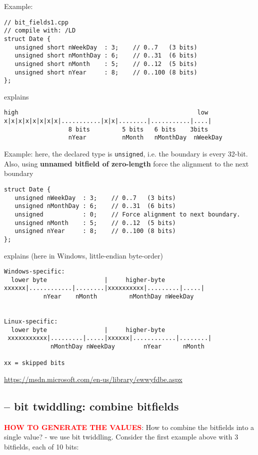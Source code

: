 Example:
\begin{lstlisting}
// bit_fields1.cpp
// compile with: /LD
struct Date {
   unsigned short nWeekDay  : 3;    // 0..7   (3 bits)
   unsigned short nMonthDay : 6;    // 0..31  (6 bits)
   unsigned short nMonth    : 5;    // 0..12  (5 bits)
   unsigned short nYear     : 8;    // 0..100 (8 bits)
};
\end{lstlisting}
explains
\begin{verbatim}
high                                                  low
x|x|x|x|x|x|x|x|...........|x|x|........|...........|....|
                  8 bits         5 bits   6 bits    3bits
                  nYear          nMonth   nMonthDay  nWeekDay
\end{verbatim}

Example: here, the declared type is \verb!unsigned!, i.e. the boundary is every
32-bit. Also, using {\bf unnamed bitfield of zero-length} force the alignment to
the next boundary
\begin{lstlisting}
struct Date {
   unsigned nWeekDay  : 3;    // 0..7   (3 bits)
   unsigned nMonthDay : 6;    // 0..31  (6 bits)
   unsigned           : 0;    // Force alignment to next boundary.
   unsigned nMonth    : 5;    // 0..12  (5 bits)
   unsigned nYear     : 8;    // 0..100 (8 bits)
};
\end{lstlisting}
explains (here in Windows, little-endian byte-order)
\begin{verbatim}
Windows-specific:
  lower byte                |     higher-byte
xxxxxx|............|........|xxxxxxxxxx|.........|.....|
           nYear    nMonth         nMonthDay nWeekDay


Linux-specific:
  lower byte                |     higher-byte
 xxxxxxxxxxx|.........|.....|xxxxxx|............|........|
             nMonthDay nWeekDay        nYear      nMonth
             
xx = skipped bits           
\end{verbatim}
\url{https://msdn.microsoft.com/en-us/library/ewwyfdbe.aspx}



\subsection{-- bit twiddling: combine bitfields}

\textcolor{red}{\bf HOW TO GENERATE THE VALUES}: How to combine the bitfields
into a single value? - we use bit twiddling. Consider the first example above
with 3 bitfields, each of 10 bits:

